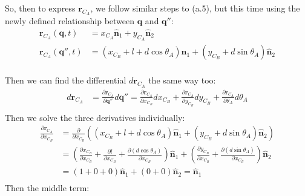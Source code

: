 \documentclass[titlepage]{article}
\begin{document}
\begin{mdframed}[linewidth=1pt, innertopmargin=10pt, innerbottommargin=10pt]
	So, then to express $\boldsymbol{r}_{C_A}$, we follow similar steps to (a.5), but this time using the newly defined relationship between $\boldsymbol{q}$ and $\boldsymbol{q}''$:
	\begin{equation}
		\begin{split}
			\boldsymbol{r}_{C_A}(\boldsymbol{q},t)&=x_{C_A}\hat{\boldsymbol{n}}_1+y_{C_A}\hat{\boldsymbol{n}}_2 \\
			\boldsymbol{r}_{C_A}(\boldsymbol{q}'',t)&=\left(x_{C_B}+l+d\cos\theta_A\right)\hat{\boldsymbol{n}}_1+\left(y_{C_B}+d\sin\theta_A\right)\hat{\boldsymbol{n}}_2 \\
		\end{split}
	\end{equation}
\end{mdframed}
Then we can find the differential $d\boldsymbol{r}_{C_A}$ the same way too:
\begin{equation}
	\begin{split}
		d\boldsymbol{r}_{C_A}&=\frac{\partial\boldsymbol{r}_{C_A}}{\partial\boldsymbol{q}''} d\boldsymbol{q}''=\frac{\partial\boldsymbol{r}_{C_A}}{\partial x_{C_B} }dx_{C_B}+\frac{\partial\boldsymbol{r}_{C_A}}{\partial y_{C_B}}dy_{C_B}+\frac{\partial\boldsymbol{r}_{C_A}}{\partial \theta_A}d\theta_A \\
	\end{split}
\end{equation}
Then we solve the three derivatives individually:
\begin{equation}
	\begin{split}
		\frac{\partial\boldsymbol{r}_{C_A}}{\partial x_{C_B}}&=\frac{\partial}{\partial x_{C_B}}\left(\left(x_{C_B}+l+d\cos\theta_A\right)\hat{\boldsymbol{n}}_1+\left(y_{C_B}+d\sin\theta_A\right)\hat{\boldsymbol{n}}_2\right) \\
		&=\left(\frac{\partial x_{C_B}}{\partial x_{C_B}}+\frac{\partial l}{\partial x_{C_B}}+\frac{\partial (d\cos\theta_A)}{\partial x_{C_B}}\right)\hat{\boldsymbol{n}}_1+\left(\frac{\partial y_{C_B}}{\partial x_{C_B}}+\frac{\partial (d\sin\theta_A)}{\partial x_{C_B}}\right)\hat{\boldsymbol{n}}_2 \\
		&=\left(1+0+0\right)\hat{\boldsymbol{n}}_1+\left(0+0\right)\hat{\boldsymbol{n}}_2=\hat{\boldsymbol{n}}_1\\
	\end{split}
\end{equation}
Then the middle term:
\end{document}
